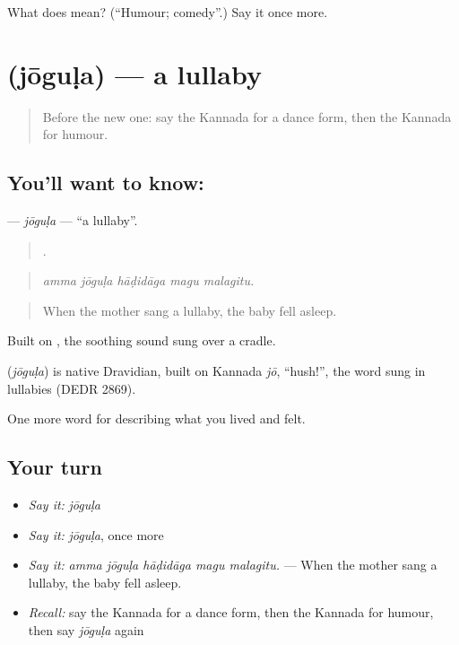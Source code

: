 \begin{tcolorbox}[breakable,colback=teal!4,colframe=teal!35!black,title={Before you move on}]
What does  mean? (\textquotedblleft{}Humour; comedy\textquotedblright{}.) Say it once more.
\end{tcolorbox}
\section[\texorpdfstring{\kn{ಜೋಗುಳ} (jōguḷa)}{ಜೋಗುಳ (jōguḷa)}]{ (jōguḷa) — a lullaby}

\label{lesson:KA-C532-jogula}



\begin{quote}
Before the new one: say the Kannada for a dance form, then the Kannada for humour.
\end{quote}

\subsection*{You'll want to know: }
\textbf{} — \emph{jōguḷa} — \textquotedblleft{}a lullaby\textquotedblright{}.

\begin{quote}
    .
\end{quote}

\begin{quote}
\emph{amma jōguḷa hāḍidāga magu malagitu.}
\end{quote}

\begin{quote}
When the mother sang a lullaby, the baby fell asleep.
\end{quote}

Built on  , the soothing sound sung over a cradle.

\begin{cousinweb}
\textbf{} (\emph{jōguḷa}) is native Dravidian, built on Kannada \emph{jō}, \textquotedblleft{}hush!\textquotedblright{}, the word sung in lullabies (DEDR 2869).
\end{cousinweb}

\begin{grammarlens}[title={What you've built}]
One more word for describing what you lived and felt.
\end{grammarlens}

\subsection*{Your turn}
\begin{itemize}
\raggedright
  \item \emph{Say it:} \emph{jōguḷa}
  \item \emph{Say it:} \emph{jōguḷa}, once more
  \item \emph{Say it:} \emph{amma jōguḷa hāḍidāga magu malagitu.} — When the mother sang a lullaby, the baby fell asleep.
  \item \emph{Recall:} say the Kannada for a dance form, then the Kannada for humour, then say \emph{jōguḷa} again
\end{itemize}

